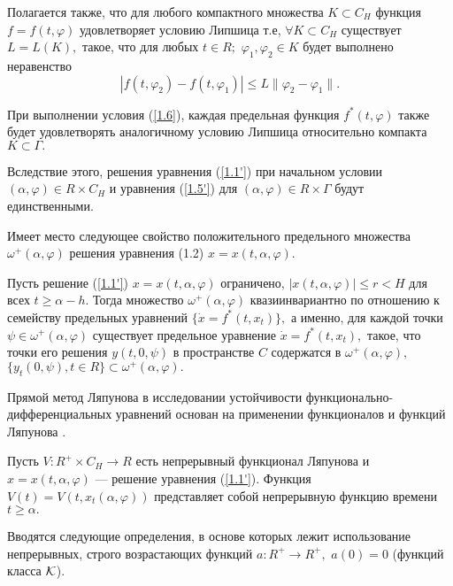 	Полагается также, что для любого компактного множества $K\subset C_H$
		функция $f=f(t,\varphi )$ удовлетворяет условию Липшица т.е, $\forall K\subset C_H$ существует $L=L(K),$ такое, что  для любых
		$t\in R;$ $\varphi _1, \varphi _2\in K$ будет выполнено неравенство
		\begin{equation}
		|f(t,\varphi _2)-f(t,\varphi _1)|\le L\|\varphi _2-\varphi _1\|.
		\label{1.6}
		\end{equation}
	
	При выполнении условия (\ref{1.6}), каждая
	предельная функция $f^*(t,\varphi )$ также будет удовлетворять
	аналогичному условию Липшица относительно компакта
	$K\subset\Gamma.$
	
	Вследствие этого, решения
	уравнения (\ref{1.1'}) при начальном условии $(\alpha,\varphi )\in R 
	\times C_H$ и уравнения (\ref{1.5'}) для $(\alpha,\varphi )\in R
	\times\Gamma $ будут единственными.

	
	Имеет место следующее свойство положительного предельного множества $\omega^{+} (\alpha, \varphi)$ решения уравнения (1.2) $x = x(t, \alpha, \varphi).$
	
	\begin{theorem}\label{t-1.2}  \cite{andr10} Пусть  решение  (\ref{1.1'}) $x=x(t,\alpha ,\varphi )$
		ограничено, $|x(t,\alpha ,\varphi)|\le r<H$ для всех $t\ge \alpha
		-h.$ Тогда множество $\omega ^+(\alpha ,\varphi )$
		квазиинвариантно по отношению к семейству предельных уравнений
		$\{\dot x=f^*(t,x_t)\},$ а именно,  для  каждой точки $\psi\in\omega
		^+(\alpha ,\varphi )$ существует предельное уравнение $\dot
		x=f^*(t,x_t),$ такое, что точки его решения
		$y(t,0,\psi )$ в пространстве $C$ содержатся в $\omega^+(\alpha,\varphi ),$
		$\{ y_t(0,\psi ), t\in R\}\subset\omega ^+(\alpha ,\varphi ).$
	\end{theorem}
	
	Прямой метод Ляпунова в исследовании устойчивости функ\-ци\-о\-наль\-но-диф\-фе\-рен\-ци\-аль\-ных
	уравнений основан на применении функционалов и функций Ляпунова \cite{}.
	
	Пусть $V:R^+\times C_H\to R$ есть непрерывный функционал Ляпунова и
	$x=x(t,\alpha ,\varphi )$ ---
	решение уравнения (\ref{1.1'}). Функция $V(t)=V(t,x_t(\alpha
	,\varphi ))$ представляет собой непрерывную функцию времени
	$t\ge\alpha.$
	
	Вводятся следующие
	определения, в основе которых лежит использование непрерывных,
	строго возрастающих функций
	$a:R^+\to R^+,$ $a(0)=0$ (функций класса $\cal K$).
	
